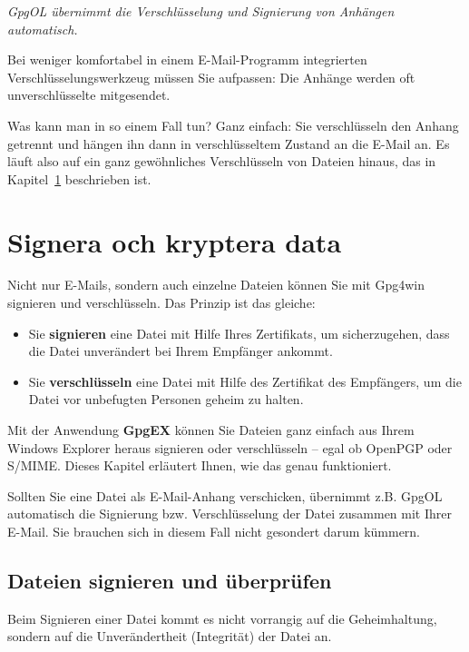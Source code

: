 \documentclass[a4paper,11pt, oneside,openright,titlepage,dvips]{scrbook}
\newcommand{\Email}{E-Mail}
\newcounter{chapter}
\newcounter{section}[chapter]
\begin{document}
\textit{GpgOL übernimmt die Verschlüsselung und Signierung von
Anhängen automatisch.}

Bei weniger komfortabel in einem \Email{}-Programm integrierten
Verschlüsselungswerkzeug müssen Sie aufpassen: Die
Anhänge werden oft unverschlüsselte mitgesendet.

Was kann man in so einem Fall tun?
Ganz einfach: Sie verschlüsseln den Anhang getrennt und hängen ihn
dann in verschlüsseltem Zustand an die \Email{} an.
Es läuft also auf ein ganz gewöhnliches Verschlüsseln von Dateien
hinaus, das in Kapitel~\ref{ch:EncFiles} beschrieben ist.


\clearpage
{}
\chapter{Signera och kryptera data}
\label{ch:EncFiles}

Nicht nur \Email{}s, sondern auch einzelne Dateien können Sie mit
Gpg4win signieren und verschlüsseln. Das Prinzip ist das gleiche: 

\begin{itemize}
    \item Sie \textbf{signieren} eine Datei mit Hilfe Ihres
        Zertifikats, um sicherzugehen, dass die
      Datei unverändert bei Ihrem Empfänger ankommt.

  \item Sie \textbf{verschlüsseln} eine Datei mit Hilfe des Zertifikat des Empfängers, um
        die Datei vor unbefugten Personen geheim zu halten.
\end{itemize}



Mit der Anwendung \textbf{GpgEX} können Sie Dateien ganz einfach aus
Ihrem Windows Explorer heraus signieren oder verschlüsseln -- egal ob
OpenPGP oder S/MIME.
Dieses Kapitel erläutert Ihnen, wie das genau funktioniert.

Sollten Sie eine Datei als \Email{}-Anhang verschicken, übernimmt z.B. GpgOL
automatisch die Signierung bzw. Verschlüsselung der Datei zusammen mit
Ihrer \Email{}.
Sie brauchen sich in diesem Fall nicht gesondert darum kümmern.


\clearpage
\section{Dateien signieren und überprüfen}
\label{sec_signFile}

Beim Signieren einer Datei kommt es nicht vorrangig auf die
Geheimhaltung, sondern auf die Unverändertheit (Integrität) der Datei an.
\end{document}

